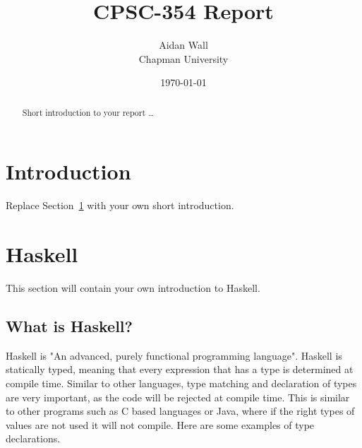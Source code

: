 \documentclass{article}
\title{CPSC-354 Report}
\author{Aidan Wall  \\ Chapman University}
\date{\today}
\begin{document}
\maketitle

\begin{abstract}
Short introduction to your report \ldots
\end{abstract}

\tableofcontents

\section{Introduction}\label{intro}

Replace Section~\ref{intro} with your own short introduction.







\section{Haskell}\label{haskell}




This section will contain your own introduction to Haskell.
\subsection{What is Haskell?}


Haskell is "An advanced, purely functional programming language". Haskell is statically typed, meaning that every expression that has a type is determined at compile time. Similar to other languages, type matching and declaration of types are very important, as the code will be rejected at compile time. This is similar to other programs such as C based languages or Java, where if the right types of values are not used it will not compile. Here are some examples of type declarations.
\end{document}
